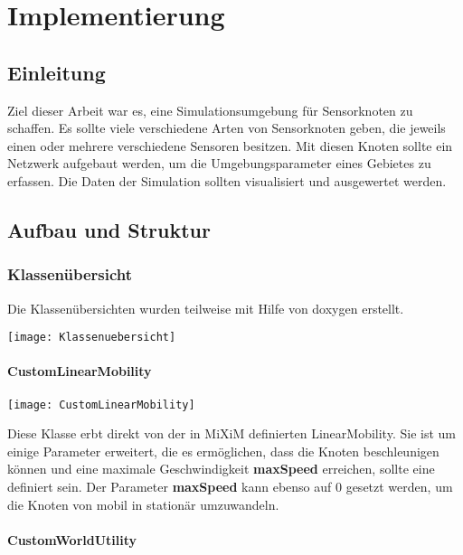 \chapter{Implementierung}

\section{Einleitung}

Ziel dieser Arbeit war es, eine Simulationsumgebung für Sensorknoten zu schaffen. Es sollte viele verschiedene Arten von Sensorknoten geben, die jeweils einen oder mehrere verschiedene Sensoren besitzen. Mit diesen Knoten sollte ein Netzwerk aufgebaut werden, um die Umgebungsparameter eines Gebietes zu erfassen.
Die Daten der Simulation sollten visualisiert und ausgewertet werden.

\section{Aufbau und Struktur}

\subsection{Klassenübersicht}

Die Klassenübersichten wurden teilweise mit Hilfe von doxygen\cite{doxygen} erstellt. 

\begin{center}
\texttt{[image: Klassenuebersicht]}
\end{center}

\subsubsection{CustomLinearMobility}

\begin{center}
\texttt{[image: CustomLinearMobility]}
\end{center}

Diese Klasse erbt direkt von der in MiXiM definierten LinearMobility. Sie ist um einige Parameter erweitert, die es ermöglichen, dass die Knoten beschleunigen können und eine maximale Geschwindigkeit \textbf{maxSpeed} erreichen, sollte eine definiert sein.
Der Parameter \textbf{maxSpeed} kann ebenso auf 0 gesetzt werden, um die Knoten von mobil in stationär umzuwandeln.

\subsubsection{CustomWorldUtility}

